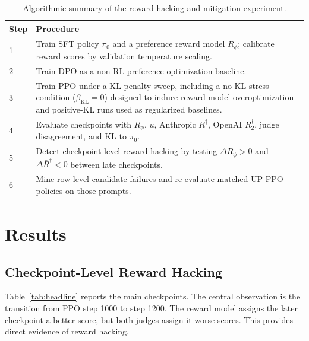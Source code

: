 \documentclass[11pt]{article}
\newcommand{\Rphi}{R_{\phi}}
\newcommand{\Rdag}{R^{\dagger}}
\newcommand{\Rtwo}{R^{\dagger}_2}
\begin{document}
\begin{table}[!tbp]
\centering
\scriptsize
\caption{External judge configuration. Both judges receive the generated assistant reply and return a single helpfulness score in $[1,10]$.}
\label{tab:judge_config}
\end{table}

\begin{table}[!tbp]
\centering
\scriptsize
\caption{Algorithmic summary of the reward-hacking and mitigation experiment.}
\label{alg:main}
\begin{tabular}{p{}p{}}
\toprule
Step & Procedure \\
\midrule
1 & Train SFT policy $\pi_0$ and a preference reward model $\Rphi$; calibrate reward scores by validation temperature scaling. \\
2 & Train DPO as a non-RL preference-optimization baseline. \\
3 & Train PPO under a KL-penalty sweep, including a no-KL stress condition ($\beta_{\mathrm{KL}}=0$) designed to induce reward-model overoptimization and positive-KL runs used as regularized baselines. \\
4 & Evaluate checkpoints with $\Rphi$, $u$, Anthropic $\Rdag$, OpenAI $\Rtwo$, judge disagreement, and KL to $\pi_0$. \\
5 & Detect checkpoint-level reward hacking by testing $\Delta\Rphi>0$ and $\Delta\bar R^\dagger<0$ between late checkpoints. \\
6 & Mine row-level candidate failures and re-evaluate matched UP-PPO policies on those prompts. \\
\bottomrule
\end{tabular}
\end{table}

\section{Results}
\subsection{Checkpoint-Level Reward Hacking}
Table~\ref{tab:headline} reports the main checkpoints. The central observation is the transition from PPO step 1000 to step 1200. The reward model assigns the later checkpoint a better score, but both judges assign it worse scores. This provides direct evidence of reward hacking.
\end{document}
